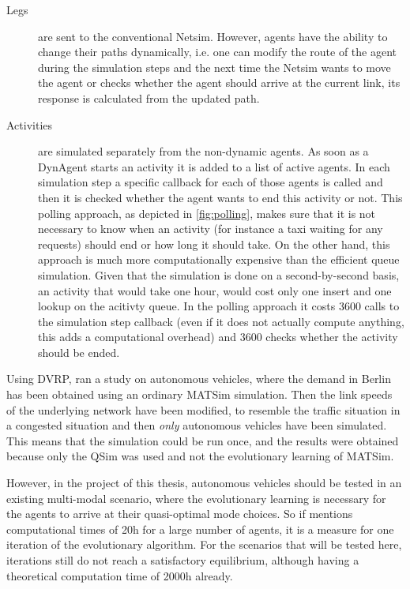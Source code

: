 \begin{description}
\item[Legs] are sent to the conventional Netsim. However, agents have the ability
to change their paths dynamically, i.e. one can modify the route of the agent
during the simulation steps and the next time the Netsim wants to move the agent
or checks whether the agent should arrive at the current link, its response is
calculated from the updated path.
\item[Activities] are simulated separately from the non-dynamic agents. As soon
as a DynAgent starts an activity it is added to a list of active agents. In each
simulation step a specific callback for each of those agents is called and then
it is checked whether the agent wants to end this activity or not.
This polling approach, as depicted in \cref{fig:polling}, makes sure that it is
not necessary to know when an activity (for instance a taxi waiting for any
requests) should end or how long it should take. On the other hand, this approach
is much more computationally expensive than the efficient queue simulation.
Given that the simulation is done on a second-by-second basis, an activity that
would take one hour, would cost only one insert and one lookup on the acitivty queue.
In the polling approach it costs 3600 calls to the simulation step callback (even
if it does not actually compute anything, this adds a computational overhead) and
3600 checks whether the activity should be ended.
\end{description}

Using DVRP, \citet{Bischoff2016} ran a study
on autonomous vehicles, where the demand in Berlin has been
obtained using an ordinary MATSim simulation. Then the link speeds of the underlying
network have been modified, to resemble the traffic situation in a congested
situation and then \textit{only} autonomous vehicles have been simulated. This
means that the simulation could be run once, and the results were obtained because
only the QSim was used and not the evolutionary learning of MATSim.

However, in the project of this thesis, autonomous vehicles should be tested in
an existing multi-modal scenario, where the evolutionary learning is necessary
for the agents to arrive at their quasi-optimal mode choices. So if
\citet{Bischoff2016} mentions computational times of 20h for a large number of agents,
it is a measure for one iteration of the evolutionary algorithm. For the scenarios
that will be tested here, iterations still do not reach a satisfactory
equilibrium, although having a theoretical computation time of 2000h already.

